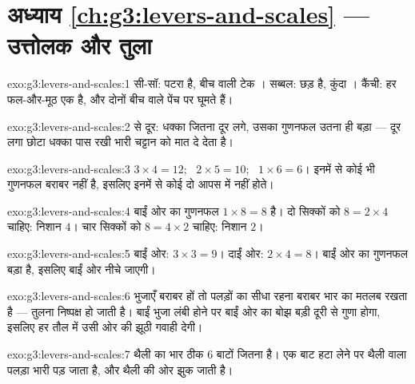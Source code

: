 \section*{अध्याय \ref{ch:g3:levers-and-scales} --- उत्तोलक और तुला}

\begin{solution}{exo:g3:levers-and-scales:1}
सी-सॉ: पटरा  है, बीच वाली टेक । सब्बल: छड़  है,
कुंदा । कैंची: हर फल-और-मूठ एक  है, और दोनों बीच वाले पेंच
पर घूमते हैं।
\end{solution}

\begin{solution}{exo:g3:levers-and-scales:2}
 से दूर: धक्का जितना दूर लगे, उसका गुणनफल उतना ही बड़ा --- दूर
लगा छोटा धक्का पास रखी भारी चट्टान को मात दे देता है।
\end{solution}

\begin{solution}{exo:g3:levers-and-scales:3}
$3 \times 4 = 12$; \ $2 \times 5 = 10$; \ $1 \times 6 = 6$। इनमें
से कोई भी गुणनफल बराबर नहीं है, इसलिए इनमें से कोई दो आपस में
 नहीं होते।
\end{solution}

\begin{solution}{exo:g3:levers-and-scales:4}
बाईं ओर का गुणनफल $1 \times 8 = 8$ है। दो सिक्कों को $8 = 2 \times
4$ चाहिए: निशान $4$। चार सिक्कों को $8 = 4 \times 2$ चाहिए: निशान
$2$।
\end{solution}

\begin{solution}{exo:g3:levers-and-scales:5}
बाईं ओर: $3 \times 3 = 9$। दाईं ओर: $2 \times 4 = 8$। बाईं ओर का
गुणनफल बड़ा है, इसलिए बाईं ओर नीचे जाएगी।
\end{solution}

\begin{solution}{exo:g3:levers-and-scales:6}
भुजाएँ बराबर हों तो पलड़ों का सीधा रहना बराबर भार का मतलब रखता है ---
तुलना निष्पक्ष हो जाती है। बाईं भुजा लंबी होने पर बाईं ओर का बोझ
बड़ी दूरी से गुणा होगा, इसलिए  हर तौल में उसी ओर की झूठी गवाही
देगी।
\end{solution}

\begin{solution}{exo:g3:levers-and-scales:7}
थैली का भार ठीक $6$ बाटों जितना है। एक बाट हटा लेने पर थैली वाला
पलड़ा भारी पड़ जाता है, और  थैली की ओर झुक जाती है।
\end{solution}

